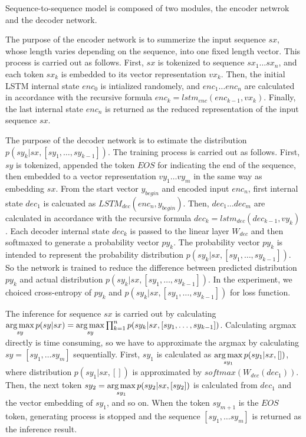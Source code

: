 \documentclass[senior,final,11pt]{iscs-thesis}
\newcommand{\argmax}{\mathop{\rm arg\,max}\limits}
\begin{document}
Sequence-to-sequence model is composed of two modules, the encoder netwrok and the decoder network.

The purpose of the encoder network is to summerize the input sequence $sx$, whose length varies depending on the sequence, into one fixed length vector.
This process is carried out as follows. 
First, $sx$ is tokenized to sequence $sx_{1} \dots sx_{n}$, and each token $sx_{k}$ is embedded to its vector representation $vx_{k}$. 
Then, the initial LSTM internal state $enc_0$ is intialized randomely, 
and $ enc_{1} \dots enc_{n} $ are calculated in accordance with the recursive formula $ enc_{k} = lstm_{enc}(enc_{k-1},vx_{k}) $.
Finally, the last internal state $ enc_{n}$ is returned as the reduced representation of the input sequence $sx$.

The purpose of the decoder network is to estimate the distribution $ p(sy_k|sx,[sy_1,\dots,sy_{k-1}]) $. 
The training process is carried out as follows. 
First, $sy$ is tokenized, appended the token $ EOS $ for indicating the end of the sequence, then embedded to a vector representation $vy_{1} \dots vy_{m}$ in the same way as embedding $sx$.
From the start vector $y_{begin}$ and encoded input $ enc_{n} $, first internal state $ dec_{1}$ is calcuated as $ LSTM_{dec}(enc_{n},y_{begin}) $.
Then, $ dec_{1} \dots dec_{m} $ are calculated in accordance with the recursive formula $ dec_{k} = lstm_{dec}(dec_{k-1},vy_{k}) $.
Each decoder internal state $ dec_{k} $ is passed to the linear layer $ W_{dec} $ and then softmaxed to generate a probability vector $ py_{k} $.
The probability vector $ py_{k} $ is intended to represent the probability distribution $ p(sy_k|sx,[sy_1,\dots,sy_{k-1}]) $.
So the network is trained to reduce the difference between predicted distribution $ py_{k} $ and actual distribution $ p(sy_k|sx,[sy_1,\dots,sy_{k-1}]) $.
In the experiment, we choiced cross-entropy of $ py_{k} $ and $ p(sy_k|sx,[sy_1,\dots,sy_{k-1}]) $ for loss function.

The inference for sequence $sx$ is carried out by calculating 
$ \argmax_{sy} p(sy|sx) = \argmax_{sy} \prod_{k=1}^n p(sy_k|sx,[sy_1,\dots,sy_{k-1}]) $.
Calculating argmax directly is time consuming, so we have to approximate the argmax by calculating $sy = [sy_1, \dots sy_m]$ sequentially.
First, $sy_1$ is calculated as $ \argmax_{sy_1} p(sy_1|sx,[]) $, where distribution $ p(sy_1|sx,[]) $ is approximated by 
$ softmax(W_{dec}(dec_{1}))$. 
Then, the next token $sy_2 = \argmax_{sy_1} p(sy_2|sx,[sy_2]) $ is calculated from $ dec_{1} $ and the vector embedding of $sy_1$, and so on.
When the token $sy_{m+1}$ is the $ EOS $ token, generating process is stopped and the sequence $ [sy_1, \dots sy_m]$ is returned as the inference result.
\end{document}
